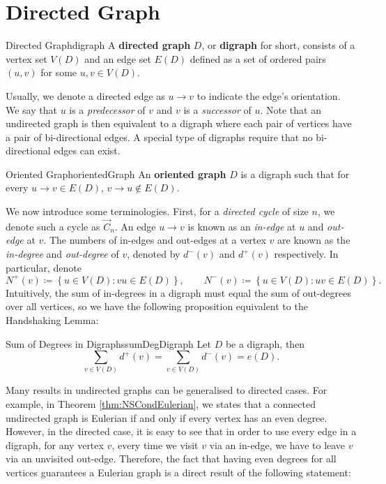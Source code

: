 \documentclass[math]{amznotes}
\theoremstyle{remark}
\begin{document}
\section{Directed Graph}
\begin{dfnbox}{Directed Graph}{digraph}
    A {\color{red} \textbf{directed graph}} $D$, or {\color{red} \textbf{digraph}} for short, consists of a vertex set $V(D)$ and an edge set $E(D)$ defined as a set of ordered pairs $(u, v)$ for some $u, v \in V(D)$.
\end{dfnbox}
Usually, we denote a directed edge as $u \to v$ to indicate the edge's orientation. We say that $u$ is a \textit{predecessor} of $v$ and $v$ is a \textit{successor} of $u$. Note that an undirected graph is then equivalent to a digraph where each pair of vertices have a pair of bi-directional edges. A special type of digraphs require that no bi-directional edges can exist.
\begin{dfnbox}{Oriented Graph}{orientedGraph}
    An {\color{red} \textbf{oriented graph}} $D$ is a digraph such that for every $u \to v \in E(D)$, $v \to u \notin E(D)$.
\end{dfnbox}
We now introduce some terminologies. First, for a \textit{directed cycle} of size $n$, we denote such a cycle as $\overrightarrow{C}_n$. An edge $u \to v$ is known as an \textit{in-edge} at $u$ and \textit{out-edge} at $v$. The numbers of in-edges and out-edges at a vertex $v$ are known as the \textit{in-degree} and \textit{out-degree} of $v$, denoted by $d^-(v)$ and $d^+(v)$ respectively. In particular, denote 
\begin{equation*}
    N^+(v) \coloneqq \left\{u \in V(D) \colon vu \in E(D)\right\}, \qquad N^-(v) \coloneqq \left\{u \in V(D) \colon uv \in E(D)\right\}.
\end{equation*}
Intuitively, the sum of in-degrees in a digraph must equal the sum of out-degrees over all vertices, so we have the following proposition equivalent to the Handshaking Lemma:
\begin{probox}{Sum of Degrees in Digraphs}{sumDegDigraph}
    Let $D$ be a digraph, then 
    \begin{equation*}
        \sum_{v \in V(D)}d^+(v) = \sum_{v \in V(D)}d^-(v) = e(D).
    \end{equation*}
\end{probox}
Many results in undirected graphs can be generalised to directed cases. For example, in Theorem \ref{thm:NSCondEulerian}, we states that a connected undirected graph is Eulerian if and only if every vertex has an even degree. However, in the directed case, it is easy to see that in order to use every edge in a digraph, for any vertex $v$, every time we visit $v$ via an in-edge, we have to leave $v$ via an unvisited out-edge. Therefore, the fact that having even degrees for all vertices guarantees a Eulerian graph is a direct result of the following statement:
\end{document}
